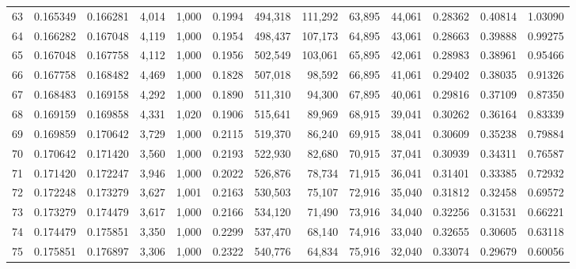 \begin{tabular}{rrrrrrrrrrrrr}
63  &  0.165349 &  0.166281 &   4,014 &  1,000 &                                     0.1994 &  494,318 &  111,292 &   63,895 &   44,061 &  0.28362 &  0.40814 &  1.03090 \\
64  &  0.166282 &  0.167048 &   4,119 &  1,000 &                                     0.1954 &  498,437 &  107,173 &   64,895 &   43,061 &  0.28663 &  0.39888 &  0.99275 \\
65  &  0.167048 &  0.167758 &   4,112 &  1,000 &                                     0.1956 &  502,549 &  103,061 &   65,895 &   42,061 &  0.28983 &  0.38961 &  0.95466 \\
66  &  0.167758 &  0.168482 &   4,469 &  1,000 &                                     0.1828 &  507,018 &   98,592 &   66,895 &   41,061 &  0.29402 &  0.38035 &  0.91326 \\
67  &  0.168483 &  0.169158 &   4,292 &  1,000 &                                     0.1890 &  511,310 &   94,300 &   67,895 &   40,061 &  0.29816 &  0.37109 &  0.87350 \\
68  &  0.169159 &  0.169858 &   4,331 &  1,020 &                                     0.1906 &  515,641 &   89,969 &   68,915 &   39,041 &  0.30262 &  0.36164 &  0.83339 \\
69  &  0.169859 &  0.170642 &   3,729 &  1,000 &                                     0.2115 &  519,370 &   86,240 &   69,915 &   38,041 &  0.30609 &  0.35238 &  0.79884 \\
70  &  0.170642 &  0.171420 &   3,560 &  1,000 &                                     0.2193 &  522,930 &   82,680 &   70,915 &   37,041 &  0.30939 &  0.34311 &  0.76587 \\
71  &  0.171420 &  0.172247 &   3,946 &  1,000 &                                     0.2022 &  526,876 &   78,734 &   71,915 &   36,041 &  0.31401 &  0.33385 &  0.72932 \\
72  &  0.172248 &  0.173279 &   3,627 &  1,001 &                                     0.2163 &  530,503 &   75,107 &   72,916 &   35,040 &  0.31812 &  0.32458 &  0.69572 \\
73  &  0.173279 &  0.174479 &   3,617 &  1,000 &                                     0.2166 &  534,120 &   71,490 &   73,916 &   34,040 &  0.32256 &  0.31531 &  0.66221 \\
74  &  0.174479 &  0.175851 &   3,350 &  1,000 &                                     0.2299 &  537,470 &   68,140 &   74,916 &   33,040 &  0.32655 &  0.30605 &  0.63118 \\
75  &  0.175851 &  0.176897 &   3,306 &  1,000 &                                     0.2322 &  540,776 &   64,834 &   75,916 &   32,040 &  0.33074 &  0.29679 &  0.60056 \\

\end{tabular}
